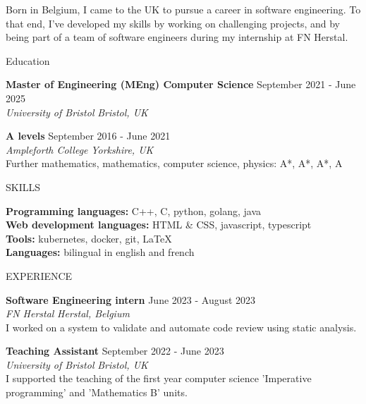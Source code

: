 \documentclass{resume} %
\begin{document}


{Born in Belgium, I came to the UK to pursue a career in software engineering. To that end, I've developed my skills by working on challenging projects, and by being part of a team of software engineers during my internship at FN Herstal.}



\begin{rSection}{Education}

{\bf Master of Engineering (MEng) Computer Science} \hfill {September 2021 - June 2025} \\
\textit{University of Bristol} \hfill \textit{Bristol, UK}

{\bf A levels} \hfill {September 2016 - June 2021} \\
\textit{Ampleforth College} \hfill \textit{Yorkshire, UK} \\
Further mathematics, mathematics, computer science, physics: A*, A*, A*, A

\end{rSection}

\begin{rSection}{SKILLS}

{\bf Programming languages:} C++, C, python, golang, java \\
{\bf Web development languages:} HTML \& CSS, javascript, typescript \\
{\bf Tools:} kubernetes, docker, git, LaTeX \\
{\bf Languages:} bilingual in english and french

\end{rSection}

\begin{rSection}{EXPERIENCE}

\textbf{Software Engineering intern} \hfill June 2023 - August 2023\\
  \textit{FN Herstal} \hfill \textit{Herstal, Belgium} \\
I worked on a system to validate and automate code review using static analysis.

\textbf{Teaching Assistant} \hfill September 2022 - June 2023\\
\textit{University of Bristol} \hfill \textit{Bristol, UK} \\
I supported the teaching of the first year computer science 'Imperative programming' and 'Mathematics B' units.
 
\end{rSection} 
\end{document}
